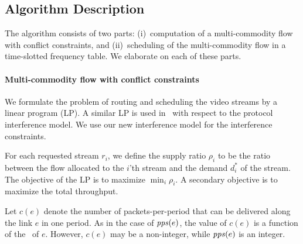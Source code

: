 \documentclass[12pt]{article}
\newenvironment{proof sketch}[1]{\noindent {\emph{Proof sketch of #1:}}}{\hfill \qed}
\newcommand{\pps}{\text{\emph{pps}}}
\newcommand{\MCS}{\text{\sc{mcs}}}
\begin{document}
\subsection{Algorithm Description}
The algorithm consists of two parts: (i)~computation of a
multi-commodity flow with conflict constraints, and (ii)~scheduling of
the multi-commodity flow in a time-slotted frequency table.
We elaborate on each of these parts.

\paragraph{Multi-commodity flow with conflict constraints}
We formulate the problem of routing and scheduling the video streams
by a linear program (LP).  A similar LP is used
in~\cite{alicherry2005joint11,buragohain2007improved} with respect to
the protocol interference model.  We use our new interference model
for the interference constraints.

For each requested stream $r_i$, we define the supply ratio $\rho_i$
to be the ratio between the flow allocated to the $i$'th stream and
the demand $d^*_i$ of the stream.  The objective of the LP is to
maximize $\min_i \rho_i$.  A secondary objective is to maximize the
total throughput.

Let $c(e)$ denote the number of packets-per-period that can be
delivered along the link $e$ in one period.  As in the case of
$\pps(e)$, the value of $c(e)$ is a function of the \MCS\ of $e$.
However, $c(e)$ may be a non-integer, while $\pps(e)$ is an integer.
\end{document}
